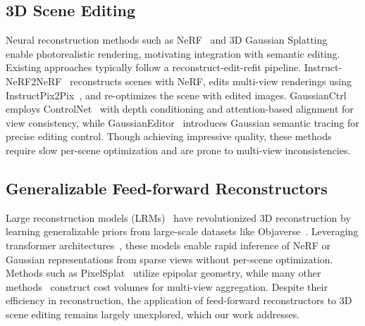 \documentclass[10pt,twocolumn,letterpaper]{article}
\begin{document}
\subsection{3D Scene Editing}
Neural reconstruction methods such as NeRF~\cite{nerf} and 3D Gaussian Splatting~\cite{3dgs} enable photorealistic rendering, motivating integration with semantic editing. Existing approaches typically follow a reconstruct-edit-refit pipeline. Instruct-NeRF2NeRF~\cite{in2n} reconstructs scenes with NeRF, edits multi-view renderings using InstructPix2Pix~\cite{ip2p}, and re-optimizes the scene with edited images. GaussianCtrl~\cite{gaussctrl} employs ControlNet~\cite{controlnet} with depth conditioning and attention-based alignment for view consistency, while GaussianEditor~\cite{gaussianeditor} introduces Gaussian semantic tracing for precise editing control. Though achieving impressive quality, these methods require slow per-scene optimization and are prone to multi-view inconsistencies.

\subsection{Generalizable Feed-forward Reconstructors}
Large reconstruction models (LRMs)~\cite{mvsnerf, pixelsplat, mvsplat, noposplat, gslrm, lgm, splatter_image, lsm} have revolutionized 3D reconstruction by learning generalizable priors from large-scale datasets like Objaverse~\cite{objaverse}. Leveraging transformer architectures~\cite{transformer, vit}, these models enable rapid inference of NeRF or Gaussian representations from sparse views without per-scene optimization. Methods such as PixelSplat~\cite{pixelsplat} utilize epipolar geometry, while many other methods~\cite{mvsnerf, murf, mvsplat, mvsplat360} construct cost volumes for multi-view aggregation. Despite their efficiency in reconstruction, the application of feed-forward reconstructors to 3D scene editing remains largely unexplored, which our work addresses.
\end{document}
